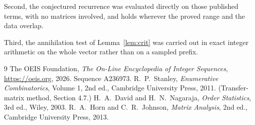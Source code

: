 \documentclass[11pt,a4paper]{article}
\theoremstyle{plain}
\theoremstyle{definition}
\begin{document}
Second, the conjectured recurrence was evaluated directly on those published terms, with no
matrices involved, and holds wherever the proved range and the data overlap.

Third, the annihilation test of Lemma~\ref{lem:crit} was carried out in exact integer
arithmetic on the whole vector rather than on a sampled prefix.

\begin{thebibliography}{9}
 The OEIS Foundation, \emph{The On-Line Encyclopedia of Integer
Sequences}, \url{https://oeis.org}, 2026. Sequence A236973.
 R.~P.~Stanley, \emph{Enumerative Combinatorics}, Volume 1, 2nd ed.,
Cambridge University Press, 2011. (Transfer-matrix method, Section 4.7.)
 H.~A.~David and H.~N.~Nagaraja, \emph{Order Statistics}, 3rd ed., Wiley,
2003.
 R.~A.~Horn and C.~R.~Johnson, \emph{Matrix Analysis}, 2nd ed., Cambridge
University Press, 2013.
\end{thebibliography}
\end{document}
